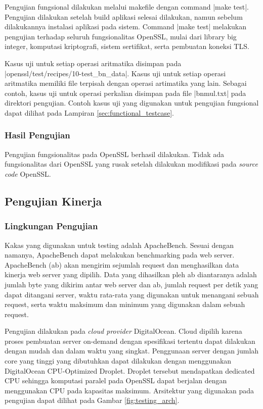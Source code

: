       Pengujian fungsional dilakukan melalui makefile dengan command |make test|. Pengujian dilakukan setelah build aplikasi selesai dilakukan, namun sebelum dilakukannya instalasi aplikasi pada sistem. Command |make test| melakukan pengujian terhadap seluruh fungsionalitas OpenSSL, mulai dari library big integer, komputasi kriptografi, sistem sertifikat, serta pembuatan koneksi TLS.

      Kasus uji untuk setiap operasi aritmatika disimpan pada |openssl/test/recipes/10-test_bn_data|. Kasus uji untuk setiap operasi aritmatika memiliki file terpisah dengan operasi artimatika yang lain. Sebagai contoh, kasus uji untuk operasi perkalian disimpan pada file |bnmul.txt| pada direktori pengujian. Contoh kasus uji yang digunakan untuk pengujian fungsional dapat dilihat pada Lampiran \ref{sec:functional_testcase}.

    \subsubsection{Hasil Pengujian}
      Pengujian fungsionalitas pada OpenSSL berhasil dilakukan. Tidak ada fungsionalitas dari OpenSSL yang rusak setelah dilakukan modifikasi pada \textit{source code} OpenSSL.

  \subsection{Pengujian Kinerja}

    \subsubsection{Lingkungan Pengujian}

      Kakas yang digunakan untuk testing adalah ApacheBench. Sesuai dengan namanya, ApacheBench dapat melakukan benchmarking pada web server. ApacheBench (ab) akan mengirim sejumlah request dan menghasilkan data kinerja web server yang dipilih. Data yang dihasilkan pleh ab diantaranya adalah jumlah byte yang dikirim antar web server dan ab, jumlah request per detik yang dapat ditangani server, waktu rata-rata yang digunakan untuk menangani sebuah request, serta waktu maksimum dan minimum yang digunakan dalam sebuah request.

      Pengujian dilakukan pada \textit{cloud provider} DigitalOcean. Cloud dipilih karena proses pembuatan server on-demand dengan spesifikasi tertentu dapat dilakukan dengan mudah dan dalam waktu yang singkat. Penggunaan server dengan jumlah core yang tinggi yang dibutuhkan dapat dilakukan dengan menggunakan DigitalOcean CPU-Optimized Droplet. Droplet tersebut mendapatkan dedicated CPU sehingga komputasi paralel pada OpenSSL dapat berjalan dengan menggunakan CPU pada kapasitas maksimum. Arsitektur yang digunakan pada pengujian dapat dilihat pada Gambar \ref{fig:testing_arch}.

